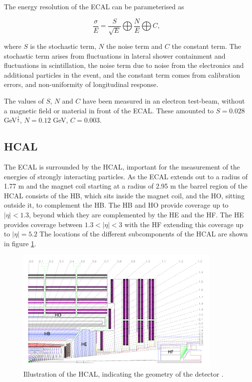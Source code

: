 The energy resolution of the \ac{ECAL} can be parameterised as

\begin{equation}\label{eqn:ecalres}
\frac{\sigma}{E} = \frac{S}{\sqrt{E}}\bigoplus\frac{N}{E}\bigoplus C,
\end{equation}

where $S$ is the stochastic term, $N$ the noise term and $C$ the constant term.
The stochastic term arises from fluctuations in lateral shower containment and 
fluctuations in scintillation, the noise term due to noise from the electronics
and additional particles in the event, and the constant term comes
from calibration errors, and non-uniformity of longitudinal response.

The values of $S$, $N$ and $C$ have been measured in an electron
test-beam, without a magnetic field or material in front of the \ac{ECAL}. These
amounted to $S = 0.028$ GeV$^{\frac{1}{2}}$, $N = 0.12$ GeV, $C= 0.003$.



\subsection{\acl{HCAL}}
\label{sec:CMSLHC_CMS_hcal}
The \ac{ECAL} is surrounded by the \ac{HCAL}, important for the
measurement of the energies of strongly interacting particles. As
the \ac{ECAL} extends out to a radius of 1.77 m and the magnet coil
starting at a radius of 2.95 m the barrel region of the \ac{HCAL} consists
of the \ac{HB}, which sits inside the magnet coil, and the \ac{HO}, sitting outside it, 
to complement the \ac{HB}. The \ac{HB} and \ac{HO}  provide coverage up to $|\eta|<1.3$, 
beyond which they are complemented by the \ac{HE} and the \ac{HF}. The \ac{HE} provides
coverage between $1.3<|\eta|<3$ with the \ac{HF} extending this coverage up to $|\eta| = 5.2$
The locations of the different subcomponents of the \ac{HCAL} are shown
in figure \ref{fig:CMS_HCAL}.

\begin{figure}[h!]
\begin{center}
\includegraphics[width=0.9\textwidth]{./Detector/Plots/HCAL.png}
\caption{Illustration of the \ac{HCAL}, indicating the geometry
of the detector \cite{cms-jinst}.}
\label{fig:CMS_HCAL}
\end{center}
\end{figure}

